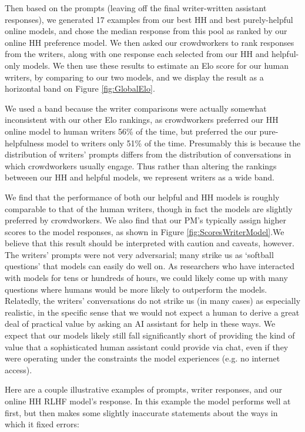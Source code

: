 Then based on the prompts (leaving off the final writer-written assistant responses), we generated 17 examples from our best HH and best purely-helpful online models, and chose the median response from this pool as ranked by our online HH preference model.  We then asked our crowdworkers to rank responses from the writers, along with one response each selected from our HH and helpful-only models.  We then use these results to estimate an Elo score for our human writers, by comparing to our two models, and we display the result as a horizontal band on Figure \ref{fig:GlobalElo}. 

We used a band because the writer comparisons were actually somewhat inconsistent with our other Elo rankings, as crowdworkers preferred our HH online model to human writers 56\% of the time, but preferred the our pure-helpfulness model to writers only 51\% of the time.  Presumably this is because the distribution of writers' prompts differs from the distribution of conversations in which crowdworkers usually engage.  Thus rather than altering the rankings betweeen our HH and helpful models, we represent writers as a wide band.

We find that the performance of both our helpful and HH models is roughly comparable to that of the human writers, though in fact the models are slightly preferred by crowdworkers.  We also find that our PM's typically assign higher scores to the model responses, as shown in Figure \ref{fig:ScoresWriterModel}.We believe that this result should be interpreted with caution and caveats, however.  The writers' prompts were not very adversarial; many strike us as `softball questions' that models can easily do well on.  As researchers who have interacted with models for tens or hundreds of hours, we could likely come up with many questions where humans would be more likely to outperform the models.  Relatedly, the writers' conversations do not strike us (in many cases) as especially realistic, in the specific sense that we would not expect a human to derive a great deal of practical value by asking an AI assistant for help in these ways.  We expect that our models likely still fall significantly short of providing the kind of value that a sophisticated human assistant could provide via chat, even if they were operating under the constraints the model experiences (e.g. no internet access).

Here are a couple illustrative examples of prompts, writer responses, and our online HH RLHF model's response. In this example the model performs well at first, but then makes some slightly inaccurate statements about the ways in which it fixed errors:

